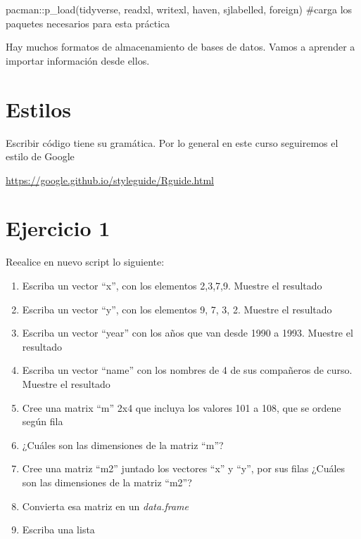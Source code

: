\documentclass[
  letterpaper,
  DIV=11,
  numbers=noendperiod]{scrreprt}
\newenvironment{Shaded}{\begin{snugshade}}{\end{snugshade}}
\newcommand{\CommentTok}[1]{\textcolor[rgb]{0.37,0.37,0.37}{#1}}
\newcommand{\FunctionTok}[1]{\textcolor[rgb]{0.28,0.35,0.67}{#1}}
\newcommand{\NormalTok}[1]{\textcolor[rgb]{0.00,0.23,0.31}{#1}}
\newcommand{\SpecialCharTok}[1]{\textcolor[rgb]{0.37,0.37,0.37}{#1}}
\begin{document}
\begin{Shaded}
\begin{Highlighting}[]
\NormalTok{pacman}\SpecialCharTok{::}\FunctionTok{p\_load}\NormalTok{(tidyverse, readxl, writexl, haven, sjlabelled, foreign) }\CommentTok{\#carga los paquetes necesarios para esta práctica}
\end{Highlighting}
\end{Shaded}

Hay muchos formatos de almacenamiento de bases de datos. Vamos a
aprender a importar información desde ellos.

\hypertarget{estilos}{%
\section{Estilos}\label{estilos}}

Escribir código tiene su gramática. Por lo general en este curso
seguiremos el estilo de Google

\url{https://google.github.io/styleguide/Rguide.html}

\hypertarget{ejercicio-1}{%
\section{Ejercicio 1}\label{ejercicio-1}}

Reealice en nuevo script lo siguiente:

\begin{enumerate}
\def\labelenumi{\arabic{enumi}.}
\item
  Escriba un vector ``x'', con los elementos 2,3,7,9. Muestre el
  resultado
\item
  Escriba un vector ``y'', con los elementos 9, 7, 3, 2. Muestre el
  resultado
\item
  Escriba un vector ``year'' con los años que van desde 1990 a 1993.
  Muestre el resultado
\item
  Escriba un vector ``name'' con los nombres de 4 de sus compañeros de
  curso. Muestre el resultado
\item
  Cree una matrix ``m'' 2x4 que incluya los valores 101 a 108, que se
  ordene según fila
\item
  ¿Cuáles son las dimensiones de la matriz ``m''?
\item
  Cree una matriz ``m2'' juntado los vectores ``x'' y ``y'', por sus
  filas ¿Cuáles son las dimensiones de la matriz ``m2''?
\item
  Convierta esa matriz en un \emph{data.frame}
\item
  Escriba una lista
\end{enumerate}
\end{document}
